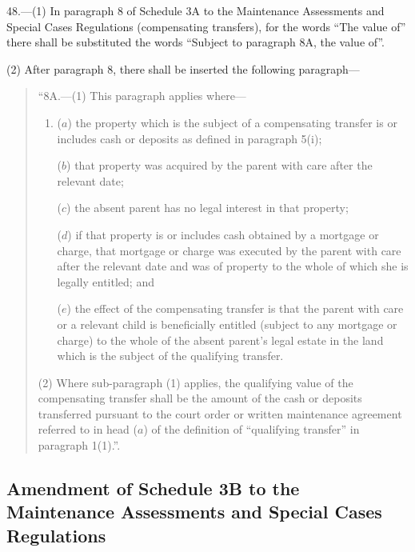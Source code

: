 \documentclass[a4paper]{article}
\begin{document}
48.—(1) In paragraph 8 of Schedule 3A to the Maintenance Assessments and Special Cases Regulations (compensating transfers), for the words “The value of” there shall be substituted the words “Subject to paragraph 8A, the value of”.

(2) After paragraph 8, there shall be inserted the following paragraph—
\begin{quotation}
“8A.—(1) This paragraph applies where—
\begin{enumerate}\item[]
($a$) the property which is the subject of a compensating transfer is or includes cash or deposits as defined in paragraph 5(i);

($b$) that property was acquired by the parent with care after the relevant date;

($c$) the absent parent has no legal interest in that property;

($d$) if that property is or includes cash obtained by a mortgage or charge, that mortgage or charge was executed by the parent with care after the relevant date and was of property to the whole of which she is legally entitled; and

($e$) the effect of the compensating transfer is that the parent with care or a relevant child is beneficially entitled (subject to any mortgage or charge) to the whole of the absent parent’s legal estate in the land which is the subject of the qualifying transfer.
\end{enumerate}

(2) Where sub-paragraph (1) applies, the qualifying value of the compensating transfer shall be the amount of the cash or deposits transferred pursuant to the court order or written maintenance agreement referred to in head ($a$) of the definition of “qualifying transfer” in paragraph 1(1).”.
\end{quotation}

\subsection[49. Amendment of Schedule 3B to the Maintenance Assessments and Special Cases Regulations]{Amendment of Schedule 3B to the Maintenance Assessments and Special Cases Regulations}
\end{document}
